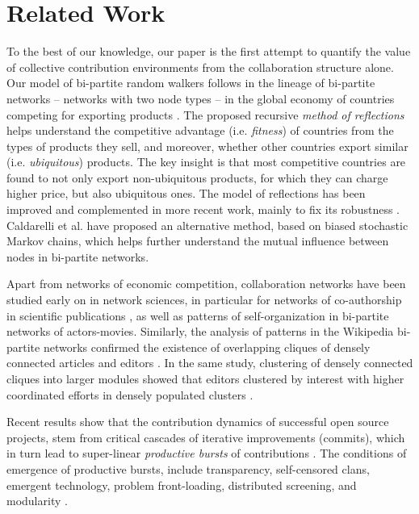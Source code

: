 \section{Related Work}
To the best of our knowledge, our paper is the first attempt to quantify the value of collective contribution environments from the collaboration structure alone. Our model of {bi-partite random walkers} follows in the lineage of bi-partite networks -- networks with two node types -- in the global economy of countries competing for exporting products \cite{hidalgo2007,hidalgo2009}. The proposed recursive {\it method of reflections} helps understand the competitive advantage (i.e. {\it fitness}) of countries from the types of products they sell, and moreover, whether other countries export similar  (i.e. {\it ubiquitous}) products. The key insight is that most competitive countries are found to not only export non-ubiquitous products, for which they can charge higher price, but also ubiquitous ones. The model of reflections has been improved and complemented in more recent work, mainly to fix its robustness \cite{tacchella2012new, cristelli2012competitors, tacchella2013economic, cristelli2013measuring}. Caldarelli et al. \cite{caldarelli2012network} have proposed an alternative method, based on biased stochastic Markov chains, which helps further understand the mutual influence between nodes in bi-partite networks.

Apart from networks of economic competition, collaboration networks have been studied early on in network sciences, in particular for networks of co-authorship in scientific publications \cite{newman2001}, as well as patterns of self-organization in bi-partite networks of actors-movies\cite{ramasco2004self}. Similarly, the analysis of patterns in the Wikipedia bi-partite networks confirmed the existence of overlapping cliques of densely connected articles and editors  \cite{jesus2009}. In the same study, clustering of densely connected cliques into larger modules \cite{guimera2007module} showed that editors clustered by interest with higher coordinated efforts in densely populated clusters \cite{jesus2009}.

Recent results show that the contribution dynamics of successful open source projects, stem from critical cascades of iterative improvements (commits), which in turn lead to super-linear {\it productive bursts} of contributions \cite{sornette2014howmuch}.  The conditions of emergence of productive bursts, include transparency, self-censored clans, emergent technology, problem front-loading, distributed screening, and modularity \cite{vonkrogh2014designing}. 

